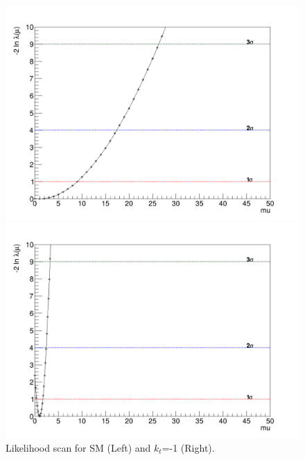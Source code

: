 \begin{linenumbers}
	\begin{figure}[!htbp]
		\centering
		\begin{minipage}[b]{0.48\textwidth}
			\includegraphics[width=\textwidth]{Chapter4/Likelihood.png}
		\end{minipage}
		\hfill
		\begin{minipage}[b]{0.48\textwidth}
			\includegraphics[width=\textwidth]{Chapter4/Likelihood-kt-1.png}
		\end{minipage}
		\caption{Likelihood scan for SM (Left) and $k_t$=-1 (Right).}
		\label{scanl}
	\end{figure}
	

\end{linenumbers}
